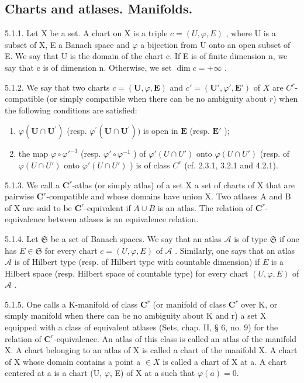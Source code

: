 \subsection{Charts and atlases. Manifolds.}

5.1.1. Let X be a set. A chart on X is a triple \(c = (U, \varphi, E)\) , where U is a subset of X, E a Banach space and \(\varphi\) a bijection from U onto an open subset of E. We say that U is the domain of the chart c. If E is of finite dimension n, we say that c is of dimension n. Otherwise, we set \(\dim c = +\infty\) .

5.1.2. We say that two charts \(c = (\mathbf{U}, \varphi, \mathbf{E})\) and \(c' = (\mathbf{U}', \varphi', \mathbf{E}')\) of \(X\) are \(C^r\)-compatible (or simply compatible when there can be no ambiguity about \(r\)) when the following conditions are satisfied:

\begin{enumerate}
\def\labelenumi{(\alph{enumi})}
\item
  \(\varphi (\mathbf{U}\cap \mathbf{U}^{\prime})\) (resp. \(\varphi^{\prime}(\mathbf{U}\cap \mathbf{U}^{\prime}))\) is open in \(\mathbf{E}\) (resp. \(\mathbf{E}'\) );
\item
  the map \(\varphi \circ \varphi'^{-1}\) (resp. \(\varphi' \circ \varphi^{-1}\) ) of \(\varphi'(U \cap U')\) onto \(\varphi(U \cap U')\) (resp. of \(\varphi(U \cap U')\) onto \(\varphi'(U \cap U')\) ) is of class \(C^r\) (cf. 2.3.1, 3.2.1 and 4.2.1).
\end{enumerate}

5.1.3. We call a \(\mathbf{C}^{r}\)-atlas (or simply atlas) of a set X a set of charts of X that are pairwise \(\mathbf{C}^{r}\)-compatible and whose domains have union X. Two atlases A and B of X are said to be \(\mathbf{C}^{r}\)-equivalent if \(A \cup B\) is an atlas. The relation of \(\mathbf{C}^{r}\)-equivalence between atlases is an equivalence relation.

5.1.4. Let \(\mathfrak{S}\) be a set of Banach spaces. We say that an atlas \(\mathcal{A}\) is of type \(\mathfrak{S}\) if one has \(E \in \mathfrak{S}\) for every chart \(c = (U, \varphi, E)\) of \(\mathcal{A}\) . Similarly, one says that an atlas \(\mathcal{A}\) is of Hilbert type (resp. of Hilbert type with countable dimension) if \(E\) is a Hilbert space (resp. Hilbert space of countable type) for every chart \((U, \varphi, E)\) of \(\mathcal{A}\) .

5.1.5. One calls a K-manifold of class \(\mathbf{C}^{r}\) (or manifold of class \(\mathbf{C}^{r}\) over K, or simply manifold when there can be no ambiguity about K and r) a set X equipped with a class of equivalent atlases (Sets, chap. II, § 6, no. 9) for the relation of \(\mathbf{C}^{r}\)-equivalence. An atlas of this class is called an atlas of the manifold X. A chart belonging to an atlas of X is called a chart of the manifold X. A chart of X whose domain contains a point a \(\in X\) is called a chart of X at a. A chart centered at a is a chart (U, \(\varphi\), E) of X at a such that \(\varphi(a) = 0\).

